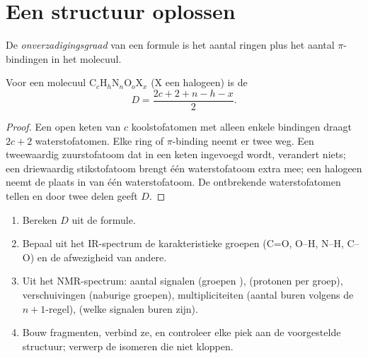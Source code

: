 \section{Een structuur oplossen}

\begin{definition}[Onverzadigingsgraad]\label{def:b1:structure-spectroscopy:unsaturation}
De \emph{onverzadigingsgraad} van een formule
is het aantal ringen plus het aantal $\pi$-bindingen in het molecuul.
\end{definition}

\begin{proposition}\label{prop:b1:structure-spectroscopy:unsaturation-formula}
Voor een molecuul $\mathrm{C}_c\mathrm{H}_h\mathrm{N}_n\mathrm{O}_o\mathrm{X}_x$
(X een halogeen) is de 
\[
  D = \frac{2c + 2 + n - h - x}{2} .
\]
\end{proposition}

\begin{proof}
Een open keten van $c$ koolstofatomen met alleen enkele bindingen draagt
$2c + 2$ waterstofatomen. Elke ring of $\pi$-binding neemt er twee weg.
Een tweewaardig zuurstofatoom dat in een keten ingevoegd wordt, verandert
niets; een driewaardig stikstofatoom brengt één waterstofatoom extra
mee; een halogeen neemt de plaats in van één waterstofatoom. De
ontbrekende waterstofatomen tellen en door twee delen geeft $D$.
\end{proof}

\begin{method}\label{met:b1:structure-spectroscopy:solve-structure}
\begin{enumerate}
  \item Bereken $D$ uit de formule.
  \item Bepaal uit het IR-spectrum de karakteristieke groepen (C=O, O--H,
        N--H, C--O) en de afwezigheid van andere.
  \item Uit het NMR-spectrum: aantal signalen (groepen ),  (protonen per groep), verschuivingen
        (naburige groepen), multipliciteiten (aantal buren volgens de
        $n + 1$-regel),  (welke signalen buren zijn).
  \item Bouw fragmenten, verbind ze, en controleer elke piek aan de
        voorgestelde structuur; verwerp de isomeren die niet kloppen.
\end{enumerate}
\end{method}

